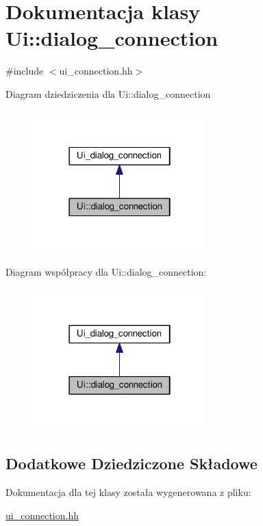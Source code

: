 \hypertarget{class_ui_1_1dialog__connection}{}\section{Dokumentacja klasy Ui\+:\+:dialog\+\_\+connection}
\label{class_ui_1_1dialog__connection}


{\ttfamily \#include $<$ui\+\_\+connection.\+hh$>$}



Diagram dziedziczenia dla Ui\+:\+:dialog\+\_\+connection\nopagebreak
\begin{figure}[H]
\begin{center}
\leavevmode
\includegraphics[width=190pt]{class_ui_1_1dialog__connection__inherit__graph}
\end{center}
\end{figure}


Diagram współpracy dla Ui\+:\+:dialog\+\_\+connection\+:\nopagebreak
\begin{figure}[H]
\begin{center}
\leavevmode
\includegraphics[width=190pt]{class_ui_1_1dialog__connection__coll__graph}
\end{center}
\end{figure}
\subsection*{Dodatkowe Dziedziczone Składowe}


Dokumentacja dla tej klasy została wygenerowana z pliku\+:\begin{DoxyCompactItemize}
\item 
\hyperlink{ui__connection_8hh}{ui\+\_\+connection.\+hh}\end{DoxyCompactItemize}
